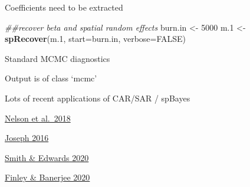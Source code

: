 \documentclass[
  ignorenonframetext,
]{beamer}
\newenvironment{Shaded}{\begin{snugshade}}{\end{snugshade}}
\newcommand{\CommentTok}[1]{\textcolor[rgb]{0.56,0.35,0.01}{\textit{#1}}}
\newcommand{\DataTypeTok}[1]{\textcolor[rgb]{0.13,0.29,0.53}{#1}}
\newcommand{\DecValTok}[1]{\textcolor[rgb]{0.00,0.00,0.81}{#1}}
\newcommand{\FloatTok}[1]{\textcolor[rgb]{0.00,0.00,0.81}{#1}}
\newcommand{\KeywordTok}[1]{\textcolor[rgb]{0.13,0.29,0.53}{\textbf{#1}}}
\newcommand{\NormalTok}[1]{#1}
\newcommand{\OtherTok}[1]{\textcolor[rgb]{0.56,0.35,0.01}{#1}}
\newcommand{\StringTok}[1]{\textcolor[rgb]{0.31,0.60,0.02}{#1}}
\begin{document}
\begin{frame}[fragile]{Coefficients need to be extracted}
\protect\hypertarget{coefficients-need-to-be-extracted}{}

\begin{Shaded}
\begin{Highlighting}[]
\CommentTok{##recover beta and spatial random effects}
\NormalTok{burn.in <-}\StringTok{ }\DecValTok{5000}
\NormalTok{m}\FloatTok{.1}\NormalTok{ <-}\StringTok{ }\KeywordTok{spRecover}\NormalTok{(m}\FloatTok{.1}\NormalTok{, }\DataTypeTok{start=}\NormalTok{burn.in, }\DataTypeTok{verbose=}\OtherTok{FALSE}\NormalTok{)}
\end{Highlighting}
\end{Shaded}

\end{frame}

\begin{frame}{Standard MCMC diagnostics}
\protect\hypertarget{standard-mcmc-diagnostics}{}

Output is of class `mcmc'

\end{frame}

\begin{frame}{Lots of recent applications of CAR/SAR / spBayes}
\protect\hypertarget{lots-of-recent-applications-of-carsar-spbayes}{}

\href{https://cdnsciencepub.com/doi/abs/10.1139/cjfas-2017-0481}{Nelson
et al.~2018}

\href{https://mc-stan.org/users/documentation/case-studies/mbjoseph-CARStan.html}{Joseph
2016}

\href{https://academic.oup.com/condor/advance-article/doi/10.1093/ornithapp/duaa065/6053195}{Smith
\& Edwards 2020}

\href{https://www.sciencedirect.com/science/article/abs/pii/S1364815219310412}{Finley
\& Banerjee 2020}

\end{frame}
\end{document}
